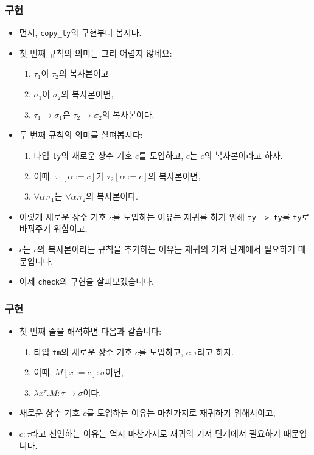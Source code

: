 \documentclass[slidestop,compress,mathserif]{beamer}
\begin{document}
    \begin{frame}
        \frametitle{구현}
        \begin{itemize}
            \item 먼저, \texttt{copy\_ty}의 구현부터 봅시다.
            \pause
            \item 첫 번째 규칙의 의미는 그리 어렵지 않네요:
            \begin{enumerate}
                \item $\tau_1$이 $\tau_2$의 복사본이고
                \item $\sigma_1$이 $\sigma_2$의 복사본이면,
                \item $\tau_1 \to \sigma_1$은 $\tau_2 \to \sigma_2$의 복사본이다.
            \end{enumerate}
            \item 두 번째 규칙의 의미를 살펴봅시다:
            \pause
            \begin{enumerate}
                \item 타입 \texttt{ty}의 새로운 상수 기호 $c$를 도입하고, $c$는 $c$의 복사본이라고 하자.
                \item 이때, $\tau_1 \left[ \alpha := c \right]$가 $\tau_2 \left[ \alpha := c \right]$의 복사본이면,
                \item $\forall \alpha . \tau_1$는 $\forall \alpha . \tau_2$의 복사본이다.
            \end{enumerate}
            \item 이렇게 새로운 상수 기호 $c$를 도입하는 이유는 재귀를 하기 위해 \texttt{ty -> ty}를 \texttt{ty}로 바꿔주기 위함이고,
            \item $c$는 $c$의 복사본이라는 규칙을 추가하는 이유는 재귀의 기저 단계에서 필요하기 때문입니다.
            \pause
            \item 이제 \texttt{check}의 구현을 살펴보겠습니다.
        \end{itemize}
    \end{frame}

    \begin{frame}
        \frametitle{구현}
        \begin{itemize}
            \item 첫 번째 줄을 해석하면 다음과 같습니다:
            \begin{enumerate}
                \item 타입 \texttt{tm}의 새로운 상수 기호 $c$를 도입하고, $c : \tau$라고 하자.
                \item 이때, $M \left[ x := c \right] : \sigma$이면,
                \item $\lambda x^{\tau} . M : \tau \to \sigma$이다.
            \end{enumerate}
            \item 새로운 상수 기호 $c$를 도입하는 이유는 마찬가지로 재귀하기 위해서이고,
            \item $c : \tau$라고 선언하는 이유는 역시 마찬가지로 재귀의 기저 단계에서 필요하기 때문입니다.
        \end{itemize}
    \end{frame}
\end{document}

